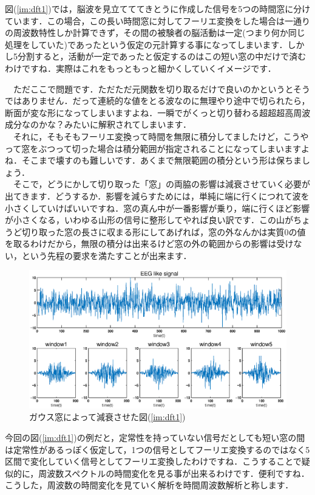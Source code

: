 \documentclass[11pt,a4paper]{ujreport} 	%
\begin{document}
図(\ref{im:dft1})では，脳波を見立てててきとうに作成した信号を5つの時間窓に分けています．この場合，この長い時間窓に対してフーリエ変換をした場合は一通りの周波数特性しか計算できず，その間の被験者の脳活動は一定(つまり何か同じ処理をしていた)であったという仮定の元計算する事になってしまいます．しかし5分割すると，活動が一定であったと仮定するのはこの短い窓の中だけで済むわけですね．実際はこれをもっともっと細かくしていくイメージです．

　ただここで問題です．ただただ元関数を切り取るだけで良いのかというとそうではありません．だって連続的な値をとる波なのに無理やり途中で切られたら，断面が変な形になってしまいますよね．一瞬でがくっと切り替わる超超超高周波成分なのかな？みたいに解釈されてしまいます．\\
　それに，そもそもフーリエ変換って時間を無限に積分してましたけど，こうやって窓をぶつって切った場合は積分範囲が指定されることになってしまいますよね．そこまで壊すのも難しいです．あくまで無限範囲の積分という形は保ちましょう．
\\
　そこで，どうにかして切り取った「窓」の両脇の影響は減衰させていく必要が出てきます．どうするか．影響を減らすためには，単純に端に行くにつれて波を小さくしていけばいいですね．窓の真ん中が一番影響が乗り，端に行くほど影響が小さくなる，いわゆる山形の信号に整形してやれば良い訳です．この山がちょうど切り取った窓の長さに収まる形にしてあげれば，窓の外なんかは実質0の値を取るわけだから，無限の積分は出来るけど窓の外の範囲からの影響は受けない，という先程の要求を満たすことが出来ます．\\


\begin{figure}[H]
  \label{im:dft2}
  \centering
  \includegraphics[width=15cm]{../figures/dft2.eps}
  \caption{ガウス窓によって減衰させた図(\ref{im:dft1})}
\end{figure}

今回の図(\ref{im:dft1})の例だと，定常性を持っていない信号だとしても短い窓の間は定常性があるっぽく仮定して，1つの信号としてフーリエ変換するのではなく5区間で変化していく信号としてフーリエ変換したわけですね．こうすることで疑似的に，周波数スペクトルの時間変化を見る事が出来るわけです．便利ですね．こうした，周波数の時間変化を見ていく解析を時間周波数解析と称します．\\
\end{document}
